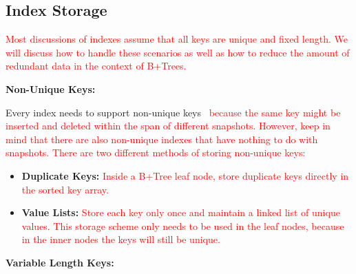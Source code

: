 \documentclass[11pt]{article}
\newcommand{\rr}[1]{\textcolor{red}{#1}}
\begin{document}
\subsection*{Index Storage}
\rr{Most discussions of indexes assume that all keys are unique and fixed length. We will discuss how to handle these scenarios as well as how to reduce the amount of redundant data in the context of B+Trees.}

\textbf{Non-Unique Keys:}

Every index needs to support non-unique keys~\cite{p203-graefe} \rr{because the same key might be inserted and deleted within the span of different snapshots. However, keep in mind that there are also non-unique indexes that have nothing to do with snapshots. There are two different methods of storing non-unique keys:}
\begin{itemize}
    \item \textbf{Duplicate Keys:}
    \rr{Inside a B+Tree leaf node, store duplicate keys directly in the sorted key array.}
    \item \textbf{Value Lists:}
    \rr{Store each key only once and maintain a linked list of unique values. This storage scheme only needs to be used in the leaf nodes, because in the inner nodes the keys will still be unique.}
\end{itemize}

\textbf{Variable Length Keys:}
\end{document}
